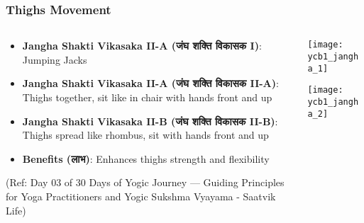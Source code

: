 \begin{frame}[fragile]\frametitle{Thighs Movement}
\begin{columns}
    \begin{column}[T]{0.5\linewidth}
      \begin{itemize}
		\item \textbf{Jangha Shakti Vikasaka II-A (जंघ शक्ति विकासक I)}: Jumping Jacks
		\item \textbf{Jangha Shakti Vikasaka II-A (जंघ शक्ति विकासक II-A)}: Thighs together, sit like in chair with hands front and up
		\item \textbf{Jangha Shakti Vikasaka II-B (जंघ शक्ति विकासक II-B)}: Thighs spread like rhombus, sit with hands front and up
		\item \textbf{Benefits (लाभ)}: Enhances thighs strength and flexibility
	  \end{itemize}
	  
		{\tiny (Ref: Day 03 of 30 Days of Yogic Journey — Guiding Principles for Yoga Practitioners and Yogic Sukshma Vyayama - Saatvik Life)}		  
    \end{column}
    \begin{column}[T]{0.5\linewidth}
		\begin{center}
		\texttt{[image: ycb1\_jangha\_1]}
		
		\texttt{[image: ycb1\_jangha\_2]}


		\end{center}	
    \end{column}
\end{columns}
\end{frame}



